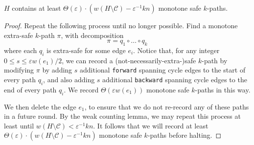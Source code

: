 \documentclass{article}\usepackage[a4paper,margin=20mm]{geometry}
\newcommand{\eps}{\varepsilon}
\newcommand{\cee}{\mathcal{C}}
\newcommand{\forward}{\texttt{forward}}
\newcommand{\backward}{\texttt{backward}}
\begin{document}
\begin{lemma}  \label{lem:warmupmed}
$H$ contains at least $\Theta(\eps) \cdot \left( w(H \setminus \cee) - \eps^{-1} kn\right)$ monotone safe $k$-paths.
\end{lemma}
\begin{proof}
Repeat the following process until no longer possible.
Find a monotone extra-safe $k$-path $\pi$, with decomposition
$$\pi = q_1 \circ \dots \circ q_k$$
where each $q_i$ is extra-safe for some edge $e_i$.
Notice that, for any integer $0 \le s \le \eps w(e_1)/2$, we can record a (not-necessarily-extra-)safe $k$-path by modifying $\pi$ by adding $s$ additional \forward{} spanning cycle edges to the start of every path $q_i$, and also adding $s$ additional \backward{} spanning cycle edges to the end of every path $q_i$.
We record $\Theta(\eps w(e_1))$ monotone safe $k$-paths in this way.

We then delete the edge $e_1$, to ensure that we do not re-record any of these paths in a future round.
By the weak counting lemma, we may repeat this process at least until $w(H \setminus \cee) < \eps^{-1} kn$.
It follows that we will record at least $\Theta(\eps) \cdot \left(w(H \setminus \cee) - \eps^{-1} kn\right)$ monotone safe $k$-paths before halting.
\end{proof}
\end{document}
